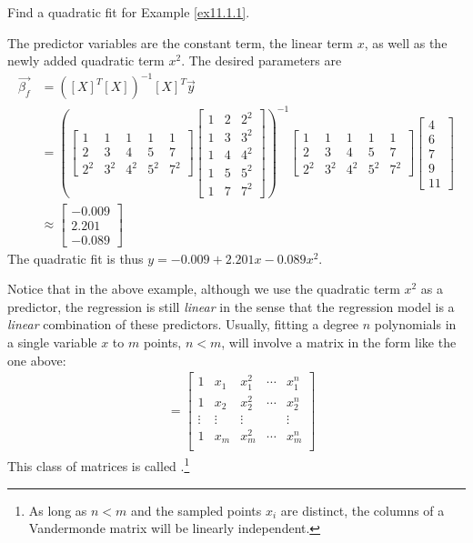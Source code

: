 \begin{exmp}
Find a quadratic fit for Example \ref{ex11.1.1}.
\end{exmp}
\begin{solution}
The predictor variables are the constant term, the linear term $x$, as well as the newly added quadratic term $x^2$. The desired parameters are
\begin{align*}
\vec{\beta_f} &= ([X]^T[X])^{-1}[X]^T \vec{y} \\
&=
\left(
\begin{bmatrix}
1 & 1 & 1 & 1 & 1 \\
2 & 3 & 4 & 5 & 7 \\
2^2 & 3^2 & 4^2 & 5^2 & 7^2
\end{bmatrix}
\begin{bmatrix}
1 & 2 & 2^2 \\
1 & 3 & 3^2 \\
1 & 4 & 4^2 \\
1 & 5 & 5^2 \\
1 & 7 & 7^2 
\end{bmatrix}
\right)^{-1}
\begin{bmatrix}
1 & 1 & 1 & 1 & 1 \\
2 & 3 & 4 & 5 & 7 \\
2^2 & 3^2 & 4^2 & 5^2 & 7^2
\end{bmatrix}
\begin{bmatrix}
4 \\
6 \\
7 \\
9 \\
11
\end{bmatrix} \\
& \approx
\begin{bmatrix}
-0.009 \\
2.201 \\
-0.089 
\end{bmatrix}
\end{align*}
The quadratic fit is thus $y = -0.009 + 2.201x - 0.089x^2$.
\end{solution}
Notice that in the above example, although we use the quadratic term $x^2$ as a predictor, the regression is still \textit{linear} in the sense that the regression model is a \textit{linear} combination of these predictors. Usually, fitting a degree $n$ polynomials in a single variable $x$ to $m$ points, $n < m$, will involve a matrix in the form like the one above:
\begin{align}
[X]
&= 
\begin{bmatrix}
1 & x_1 & x_1^2 & \cdots & x_1^n \\
1 & x_2 & x_2^2 & \cdots & x_2^n \\
\vdots & \vdots & \vdots & & \vdots \\
1 & x_m & x_m^2 & \cdots & x_m^n \\
\end{bmatrix} 
\end{align}
This class of matrices is called .\footnote{As long as $n < m$ and the sampled points $x_i$ are distinct, the columns of a Vandermonde matrix will be linearly independent.}

